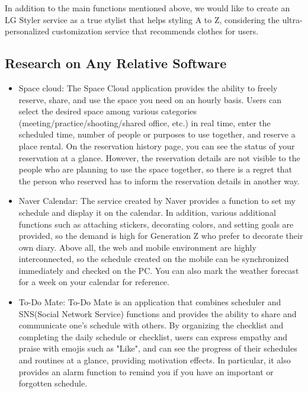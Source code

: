 \documentclass[conference]{IEEEtran}
\begin{document}
In addition to the main functions mentioned above, we would like to create an LG Styler service as a true stylist that helps styling A to Z, considering the ultra-personalized customization service that recommends clothes for users.\\

\subsection{Research on Any Relative Software}
\begin{itemize}
    \item Space cloud: The Space Cloud application provides the ability to freely reserve, share, and use the space you need on an hourly basis. Users can select the desired space among various categories (meeting/practice/shooting/shared office, etc.) in real time, enter the scheduled time, number of people or purposes to use together, and reserve a place rental. On the reservation history page, you can see the status of your reservation at a glance. However, the reservation details are not visible to the people who are planning to use the space together, so there is a regret that the person who reserved has to inform the reservation details in another way.\\
    
    \item Naver Calendar: The service created by Naver provides a function to set my schedule and display it on the calendar. In addition, various additional functions such as attaching stickers, decorating colors, and setting goals are provided, so the demand is high for Generation Z who prefer to decorate their own diary.
    Above all, the web and mobile environment are highly interconnected, so the schedule created on the mobile can be synchronized immediately and checked on the PC. You can also mark the weather forecast for a week on your calendar for reference.\\
    \item To-Do Mate: To-Do Mate is an application that combines scheduler and SNS(Social Network Service) functions and provides the ability to share and communicate one's schedule with others. By organizing the checklist and completing the daily schedule or checklist, users can express empathy and praise with emojis such as "Like", and can see the progress of their schedules and routines at a glance, providing motivation effects. In particular, it also provides an alarm function to remind you if you have an important or forgotten schedule.\\
\end{itemize}
\end{document}

